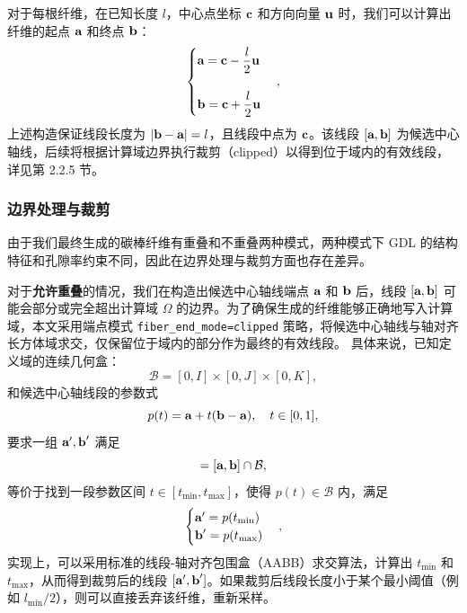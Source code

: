 对于每根纤维，在已知长度 $l$，中心点坐标 $\textbf c$ 和方向向量 $\textbf u$ 时，我们可以计算出纤维的起点 $\textbf a$ 和终点 $\textbf b$：
\begin{equation}
\begin{cases}
\textbf a = \textbf c - \dfrac{l}{2} \textbf u \\
\\
\textbf b = \textbf c + \dfrac{l}{2} \textbf u
\end{cases}
,
\end{equation}
上述构造保证线段长度为 $|\textbf b - \textbf a|=l$，且线段中点为 $\textbf c$。该线段 $[\textbf a,\textbf b]$ 为候选中心轴线，后续将根据计算域边界执行裁剪（clipped）以得到位于域内的有效线段，详见第 2.2.5 节。

\subsubsection{\textbf{边界处理与裁剪}}

由于我们最终生成的碳棒纤维有重叠和不重叠两种模式，两种模式下 GDL 的结构特征和孔隙率约束不同，因此在边界处理与裁剪方面也存在差异。

对于\textbf{允许重叠}的情况，我们在构造出候选中心轴线端点 $\textbf a$ 和 $\textbf b$ 后，线段 $[\textbf a, \textbf b]$ 可能会部分或完全超出计算域 $\Omega$ 的边界。为了确保生成的纤维能够正确地写入计算域，本文采用端点模式 \texttt{fiber\_end\_mode=clipped} 策略，将候选中心轴线与轴对齐长方体域求交，仅保留位于域内的部分作为最终的有效线段。
具体来说，已知定义域的连续几何盒：
\begin{equation}
\mathcal{B}=[0,I] \times [0,J] \times [0,K],
\end{equation}
和候选中心轴线段的参数式
\begin{equation}
p(t) = \textbf a + t(\textbf b - \textbf a), \quad t \in [0,1],
\end{equation}
要求一组 $\textbf a', \textbf b'$ 满足
\begin{equation}
[\textbf a', \textbf b'] = [\textbf a, \textbf b] \cap \mathcal{B},
\end{equation}
等价于找到一段参数区间 $t \in [t_{\min}, t_{\max}]$，使得 $p(t) \in \mathcal{B}$ 内，满足
\begin{equation}
\begin{cases}
  \textbf a' = p(t_{\min}) \\
  \textbf b' = p(t_{\max})
\end{cases}
,
\end{equation}
实现上，可以采用标准的线段-轴对齐包围盒（AABB）求交算法\cite{于瑞云2018结合轴对齐包围盒和空间划分的碰撞检测算法}，计算出 $t_{\min}$ 和 $t_{\max}$，从而得到裁剪后的线段 $[\textbf a', \textbf b']$。如果裁剪后线段长度小于某个最小阈值（例如 $l_{\min}/2$），则可以直接丢弃该纤维，重新采样。

